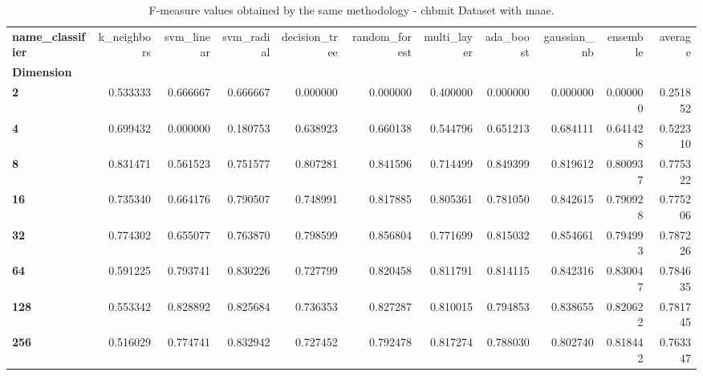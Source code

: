 \begin{table}
\centering
\caption{F-measure values obtained by the same methodology - chbmit Dataset with maae.}
\label{f-measure_chbmit_maae-reproduction}
\begin{tabular}{lrrrrrrrrrr}
\toprule
\textbf{name\_classifier} &  k\_neighbors &  svm\_linear &  svm\_radial &  decision\_tree &  random\_forest &  multi\_layer &  ada\_boost &  gaussian\_nb &  ensemble &   average \\
\textbf{Dimension} &              &             &             &                &                &              &            &              &           &           \\
\midrule
\textbf{2        } &     0.533333 &    0.666667 &    0.666667 &       0.000000 &       0.000000 &     0.400000 &   0.000000 &     0.000000 &  0.000000 &  0.251852 \\
\textbf{4        } &     0.699432 &    0.000000 &    0.180753 &       0.638923 &       0.660138 &     0.544796 &   0.651213 &     0.684111 &  0.641428 &  0.522310 \\
\textbf{8        } &     0.831471 &    0.561523 &    0.751577 &       0.807281 &       0.841596 &     0.714499 &   0.849399 &     0.819612 &  0.800937 &  0.775322 \\
\textbf{16       } &     0.735340 &    0.664176 &    0.790507 &       0.748991 &       0.817885 &     0.805361 &   0.781050 &     0.842615 &  0.790928 &  0.775206 \\
\textbf{32       } &     0.774302 &    0.655077 &    0.763870 &       0.798599 &       0.856804 &     0.771699 &   0.815032 &     0.854661 &  0.794993 &  0.787226 \\
\textbf{64       } &     0.591225 &    0.793741 &    0.830226 &       0.727799 &       0.820458 &     0.811791 &   0.814115 &     0.842316 &  0.830047 &  0.784635 \\
\textbf{128      } &     0.553342 &    0.828892 &    0.825684 &       0.736353 &       0.827287 &     0.810015 &   0.794853 &     0.838655 &  0.820622 &  0.781745 \\
\textbf{256      } &     0.516029 &    0.774741 &    0.832942 &       0.727452 &       0.792478 &     0.817274 &   0.788030 &     0.802740 &  0.818442 &  0.763347 \\
\bottomrule
\end{tabular}
\end{table}
